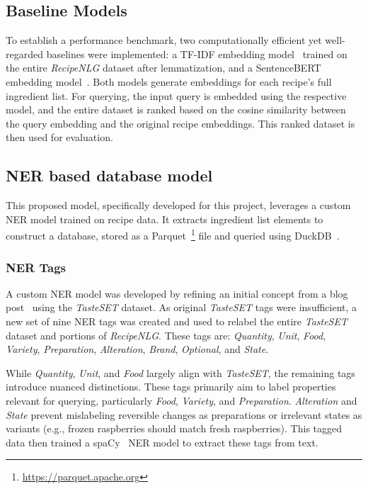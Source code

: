 \documentclass[11pt]{article}
\begin{document}
\subsection{Baseline Models}
To establish a performance benchmark, two computationally efficient yet
well-regarded baselines were implemented: a TF-IDF embedding model~\cite{tfidf}
trained on the entire \emph{RecipeNLG} dataset after lemmatization, and a
SentenceBERT embedding model~\cite{sentence-bert}.
Both models generate embeddings for each recipe's full ingredient list.
For querying, the input query is embedded using the respective model, and the
entire dataset is ranked based on the cosine similarity between the query
embedding and the original recipe embeddings.
This ranked dataset is then used for evaluation.

\subsection{NER based database model}
This proposed model, specifically developed for this project, leverages a custom
NER model trained on recipe data.
It extracts ingredient list elements to construct a database, stored as a
Parquet~\footnote{\url{https://parquet.apache.org}} file and queried using
DuckDB~\cite{duckdb}.

\subsubsection{NER Tags}\label{sec:ner_tags}
A custom NER model was developed by refining an initial concept from a blog
post~\cite{ingNerwb} using the \emph{TasteSET} dataset.
As original \emph{TasteSET} tags were insufficient, a new set of nine NER tags
was created and used to relabel the entire \emph{TasteSET} dataset and portions
of \emph{RecipeNLG}.
These tags are: \emph{Quantity}, \emph{Unit}, \emph{Food}, \emph{Variety},
\emph{Preparation}, \emph{Alteration}, \emph{Brand}, \emph{Optional}, and
\emph{State}.

While \emph{Quantity}, \emph{Unit}, and \emph{Food} largely align with
\emph{TasteSET}, the remaining tags introduce nuanced distinctions.
These tags primarily aim to label properties relevant for querying, particularly
\emph{Food}, \emph{Variety}, and \emph{Preparation}.
\emph{Alteration} and \emph{State} prevent mislabeling reversible changes as
preparations or irrelevant states as variants (e.g., frozen raspberries should
match fresh raspberries).
This tagged data then trained a spaCy~\cite{spacy} NER model to extract these
tags from text.
\end{document}
